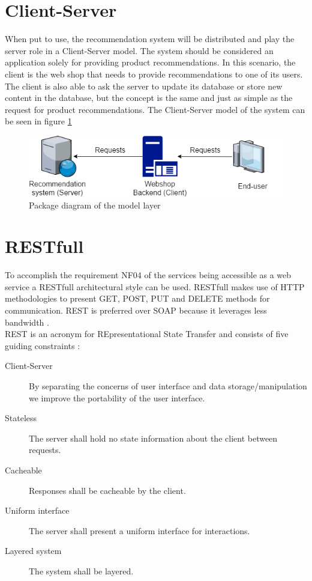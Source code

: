 \section{Client-Server}
When put to use, the recommendation system will be distributed and play the server role in a Client-Server model. The system should be considered an application solely for providing product recommendations. In this scenario, the client is the web shop that needs to provide recommendations to one of its users. The client is also able to ask the server to update its database or store new content in the database, but the concept is the same and just as simple as the request for product recommendations. The Client-Server model of the system can be seen in figure \ref{fig:ClientServer}

\begin{figure}[H]
	\centering
	\includegraphics[width=.8\linewidth]{Figures/ClientServer.png}
	\caption{Package diagram of the model layer}
	\label{fig:ClientServer}
\end{figure}

\section{RESTfull}
To accomplish the requirement NF04 of the services being accessible as a web service a RESTfull architectural style can be used. RESTfull makes use of HTTP methodologies to present GET, POST, PUT and DELETE methods for communication. REST is preferred over SOAP because it leverages less bandwidth \cite{restfull}. \\
REST is an acronym for REpresentational State Transfer and consists of five guiding constraints \cite{rest}:
\begin{description}
\item [Client-Server] By separating the concerns of user interface and data storage/manipulation we improve the portability of the user interface.
\item [Stateless] The server shall hold no state information about the client between requests.
\item [Cacheable] Responses shall be cacheable by the client.
\item [Uniform interface] The server shall present a uniform interface for interactions.
\item [Layered system] The system shall be layered.
\end{description}


